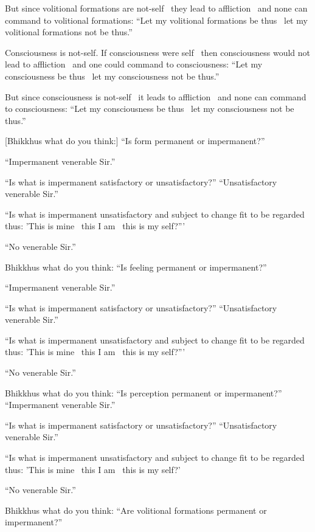 But since volitional formations are not-self \breathmark\ they lead to affliction \breathmark\ and none can command to volitional formations: ``Let my volitional formations be thus \breathmark\ let my volitional formations not be thus.''

Consciousness is not-self. If consciousness were self \breathmark\ then consciousness would not lead to affliction \breathmark\ and one could command to consciousness: ``Let my consciousness be thus \breathmark\ let my consciousness not be thus.''

But since consciousness is not-self \breathmark\ it leads to affliction \breathmark\ and none can command to consciousness: ``Let my consciousness be thus \breathmark\ let my consciousness not be thus.''

[Bhikkhus what do you think:] ``Is form permanent or impermanent?''

``Impermanent venerable Sir.''

``Is what is impermanent satisfactory or unsatisfactory?'' ``Unsatisfactory venerable Sir.''

``Is what is impermanent unsatisfactory and subject to change fit to be regarded thus: 'This is mine \breathmark\ this I am \breathmark\ this is my self?'''

``No venerable Sir.''

Bhikkhus what do you think: ``Is feeling permanent or impermanent?''

``Impermanent venerable Sir.''

``Is what is impermanent satisfactory or unsatisfactory?'' ``Unsatisfactory venerable Sir.''

``Is what is impermanent unsatisfactory and subject to change fit to be regarded thus: 'This is mine \breathmark\ this I am \breathmark\ this is my self?'''

``No venerable Sir.''

Bhikkhus what do you think: ``Is perception permanent or impermanent?'' ``Impermanent venerable Sir.''

``Is what is impermanent satisfactory or unsatisfactory?'' ``Unsatisfactory venerable Sir.''

``Is what is impermanent unsatisfactory and subject to change fit to be regarded thus: 'This is mine \breathmark\ this I am \breathmark\ this is my self?'

``No venerable Sir.''

Bhikkhus what do you think: ``Are volitional formations permanent or impermanent?''

